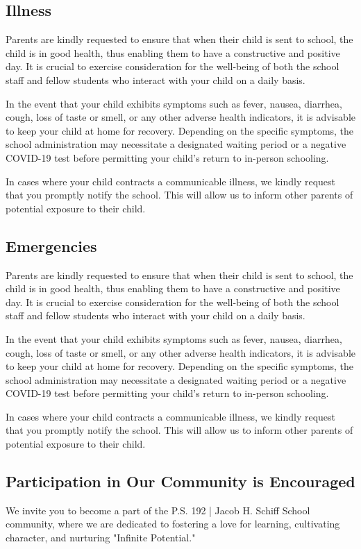 \documentclass[11pt]{article}
\begin{document}
\subsection{Illness}
\label{sec:org42912d1}
Parents are kindly requested to ensure that when their child is sent to school, the child is in good health, thus enabling them to have a constructive and positive day. It is crucial to exercise consideration for the well-being of both the school staff and fellow students who interact with your child on a daily basis.

In the event that your child exhibits symptoms such as fever, nausea, diarrhea, cough, loss of taste or smell, or any other adverse health indicators, it is advisable to keep your child at home for recovery. Depending on the specific symptoms, the school administration may necessitate a designated waiting period or a negative COVID-19 test before permitting your child’s return to in-person schooling.

In cases where your child contracts a communicable illness, we kindly request that you promptly notify the school. This will allow us to inform other parents of potential exposure to their child.

\subsection{Emergencies}
\label{sec:org88cae78}
Parents are kindly requested to ensure that when their child is sent to school, the child is in good health, thus enabling them to have a constructive and positive day. It is crucial to exercise consideration for the well-being of both the school staff and fellow students who interact with your child on a daily basis.

In the event that your child exhibits symptoms such as fever, nausea, diarrhea, cough, loss of taste or smell, or any other adverse health indicators, it is advisable to keep your child at home for recovery. Depending on the specific symptoms, the school administration may necessitate a designated waiting period or a negative COVID-19 test before permitting your child’s return to in-person schooling.

In cases where your child contracts a communicable illness, we kindly request that you promptly notify the school. This will allow us to inform other parents of potential exposure to their child.

\subsection{Participation in Our Community is Encouraged}
\label{sec:org2bc7faf}
We invite you to become a part of the P.S. 192 | Jacob H. Schiff School community, where we are dedicated to fostering a love for learning, cultivating character, and nurturing "Infinite Potential."
\end{document}
